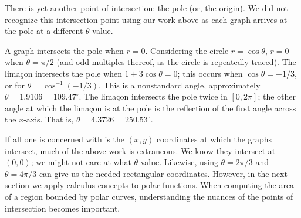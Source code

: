 {There is yet another point of intersection: the pole (or, the origin). We did not recognize this intersection point using our work above as each graph arrives at the pole at a different $\theta$ value.

A graph intersects the pole when $r=0$. Considering the circle $r=\cos\theta$, $r=0$ when $\theta = \pi/2$ (and odd multiples thereof, as the circle is repeatedly traced). The lima\c con intersects the pole when $1+3\cos\theta =0$; this occurs when $\cos \theta = -1/3$, or for $\theta = \cos^{-1}(-1/3)$. This is a nonstandard angle, approximately $\theta = 1.9106 = 109.47^\circ$. The lima\c con intersects the pole twice in $[0,2\pi]$; the other angle at which the lima\c con is at the pole is the reflection of the first angle across the $x$-axis. That is, $\theta = 4.3726 = 250.53^\circ.$}

If all one is concerned with is the $(x,y)$ coordinates at which the graphs intersect, much of the above work is extraneous. We know they intersect at $(0,0)$; we might not care at what $\theta$ value. Likewise, using $\theta =2\pi/3$ and $\theta=4\pi/3$ can give us the needed rectangular coordinates. However, in the next section we apply calculus concepts to polar functions. When computing the area of a region bounded by polar curves, understanding the nuances of the points of intersection becomes important.

